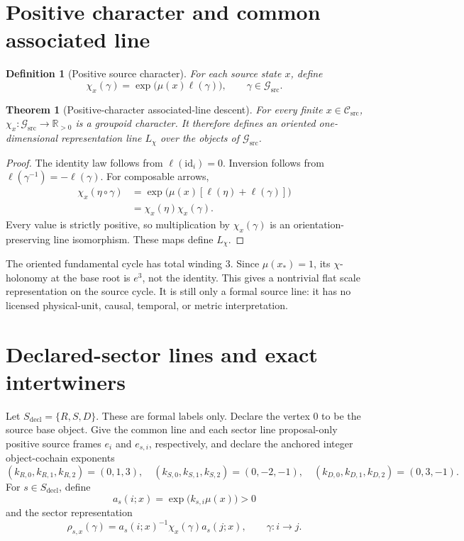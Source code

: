 \documentclass[11pt]{article}
\newtheorem{definition}{Definition}
\newtheorem{theorem}{Theorem}
\newcommand{\R}{\mathbb{R}}
\newcommand{\Gsrc}{\mathcal{G}_{\mathrm{src}}}
\newcommand{\Csrc}{\mathcal{C}_{\mathrm{src}}}
\newcommand{\Lchi}{L_{\chi}}
\begin{document}
\section{Positive character and common associated line}

\begin{definition}[Positive source character]
For each source state $x$, define
\[
\chi_x(\gamma)=\exp\!\bigl(\mu(x)\ell(\gamma)\bigr),
\qquad \gamma\in\Gsrc.
\]
\end{definition}

\begin{theorem}[Positive-character associated-line descent]
\label{thm:character}
For every finite $x\in\Csrc$, $\chi_x:\Gsrc\to\R_{>0}$ is a groupoid
character.  It therefore defines an oriented one-dimensional representation
line $\Lchi$ over the objects of $\Gsrc$.
\end{theorem}

\begin{proof}
The identity law follows from $\ell(\mathrm{id}_i)=0$.  Inversion follows from
$\ell(\gamma^{-1})=-\ell(\gamma)$.  For composable arrows,
\begin{align*}
\chi_x(\eta\circ\gamma)
&=\exp\!\bigl(\mu(x)[\ell(\eta)+\ell(\gamma)]\bigr)\\
&=\chi_x(\eta)\chi_x(\gamma).
\end{align*}
Every value is strictly positive, so multiplication by $\chi_x(\gamma)$ is an
orientation-preserving line isomorphism.  These maps define $\Lchi$.
\end{proof}

The oriented fundamental cycle has total winding $3$.  Since $\mu(x_*)=1$,
its $\chi$-holonomy at the base root is $e^3$, not the identity.  This gives a
nontrivial flat scale representation on the source cycle.  It is still only a
formal source line: it has no licensed physical-unit, causal, temporal, or
metric interpretation.

\section{Declared-sector lines and exact intertwiners}

Let $S_{\mathrm{decl}}=\{R,S,D\}$.  These are formal labels only.  Declare the
vertex $0$ to be the source base object.  Give the common line and each sector
line proposal-only positive source frames $e_i$ and $e_{s,i}$, respectively,
and declare the anchored integer object-cochain exponents
\[
(k_{R,0},k_{R,1},k_{R,2})=(0,1,3),\quad
(k_{S,0},k_{S,1},k_{S,2})=(0,-2,-1),\quad
(k_{D,0},k_{D,1},k_{D,2})=(0,3,-1).
\]
For $s\in S_{\mathrm{decl}}$, define
\[
a_s(i;x)=\exp\!\bigl(k_{s,i}\mu(x)\bigr)>0
\]
and the sector representation
\begin{equation}
\rho_{s,x}(\gamma)
=a_s(i;x)^{-1}\chi_x(\gamma)a_s(j;x),
\qquad \gamma:i\to j.
\label{eq:sectorrep}
\end{equation}
\end{document}
